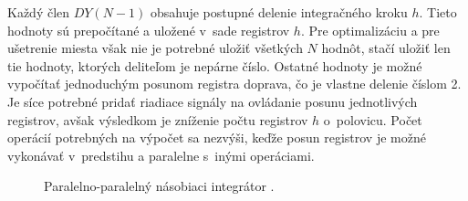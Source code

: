 Každý člen $ DY(N-1) $ obsahuje postupné delenie integračného kroku $ h $. Tieto hodnoty sú prepočítané a uložené v~sade registrov $ h $. Pre optimalizáciu a pre ušetrenie miesta však nie je potrebné uložiť všetkých $ N $ hodnôt, stačí uložiť len tie hodnoty, ktorých deliteľom je nepárne číslo. Ostatné hodnoty je možné vypočítať jednoduchým posunom registra doprava, čo je vlastne delenie číslom 2. Je síce potrebné pridať riadiace signály na ovládanie posunu jednotlivých registrov, avšak výsledkom je zníženie počtu registrov $ h $ o~polovicu. Počet operácií potrebných na výpočet sa nezvýši, keďže posun registrov je možné vykonávať v~predstihu a paralelne s~inými operáciami.

\bigskip
\begin{figure}[h]
\centering
{}
\caption{Paralelno-paralelný násobiaci integrátor \cite{ZavadaBP}.}
\label{ppni}
\end{figure}

